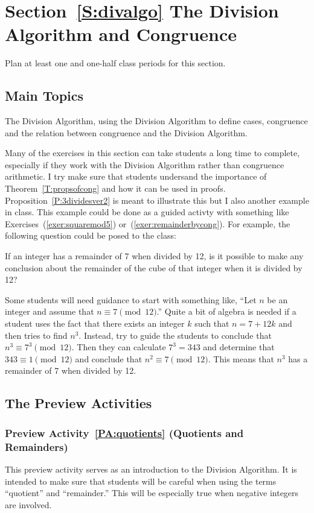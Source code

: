 \section*{Section~\ref{S:divalgo} The Division Algorithm and Congruence}
Plan at least one and one-half class periods for this section.  


\subsection*{Main Topics}
The Division Algorithm, using the Division Algorithm to define cases, congruence and the relation between congruence and the Division Algorithm.  

Many of the exercises in this section can take students a long time to complete, especially if they work with the Division Algorithm rather than congruence arithmetic.  I try make sure that students undersand the importance of Theorem~\ref{T:propsofcong} and how it can be used in proofs.  Proposition~\ref{P:3dividesver2} is meant to illustrate this but I also another example in class.  This example could be done as a guided activty with something like Exercises~(\ref{exer:squaremod5}) or~(\ref{exer:remainderbycong}).  For example, the following question could be posed to the class:

\begin{list}{}
\item If an integer has a remainder of 7 when divided by 12, is it possible to make any conclusion about the remainder of the cube of that integer when it is divided by 12?
\end{list}

\vskip6pt
Some students will need guidance to start with something like, ``Let $n$ be an integer and assume that $n \equiv 7 \pmod {12}$.''  Quite a bit of algebra is needed if a student uses the fact that there exists an integer $k$ such that $n = 7 + 12k$ and then tries to find $n^3$.  Instead, try to guide the students to conclude that $n^3 \equiv 7^3 \pmod {12}$.  Then they can calculate $7^3 = 343$ and determine that $343 \equiv 1 \pmod {12}$ and conclude that 
$n^2 \equiv 7 \pmod {12}$.  This means that $n^3$ has a remainder of 7 when divided by 12.

\subsection*{The Preview Activities}
\subsubsection*{Preview Activity~\ref{PA:quotients} (Quotients and Remainders)} 
This preview activity serves as an introduction to the Division Algorithm.  It is intended to make sure that students will be careful when using the terms ``quotient'' and ``remainder.''  This will be especially true when negative integers are involved.

